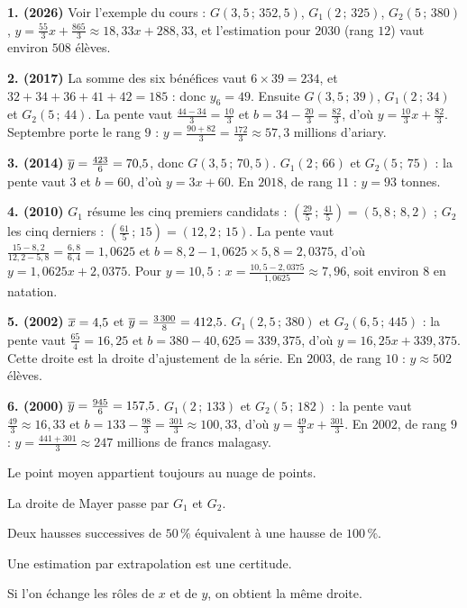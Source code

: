 \begin{corrige}[annales]
\textbf{1. (2026)} Voir l'exemple du cours : $G(3{,}5\,;\,352{,}5)$,
$G_{1}(2\,;\,325)$, $G_{2}(5\,;\,380)$,
$y = \frac{55}{3}x+\frac{865}{3} \approx 18{,}33x+288{,}33$, et
l'estimation pour $2030$ (rang $12$) vaut environ $508$ élèves.

\textbf{2. (2017)} La somme des six bénéfices vaut $6\times39 = 234$, et
$32+34+36+41+42 = 185$ : donc $y_{6} = 49$. Ensuite
$G(3{,}5\,;\,39)$, $G_{1}\left(2\,;\,34\right)$ et
$G_{2}\left(5\,;\,44\right)$. La pente vaut $\frac{44-34}{3} = \frac{10}{3}$
et $b = 34-\frac{20}{3} = \frac{82}{3}$, d'où
$y = \frac{10}{3}x+\frac{82}{3}$. Septembre porte le rang $9$ :
$y = \frac{90+82}{3} = \frac{172}{3} \approx 57{,}3$ millions d'ariary.

\textbf{3. (2014)} $\overline{y} = \frac{423}{6} = 70{,}5$, donc
$G(3{,}5\,;\,70{,}5)$. $G_{1}(2\,;\,66)$ et $G_{2}(5\,;\,75)$ : la pente
vaut $3$ et $b = 60$, d'où $y = 3x+60$. En $2018$, de rang $11$ :
$y = 93$ tonnes.

\textbf{4. (2010)} $G_{1}$ résume les cinq premiers candidats :
$\left(\frac{29}{5}\,;\,\frac{41}{5}\right) = (5{,}8\,;\,8{,}2)$ ; $G_{2}$
les cinq derniers : $\left(\frac{61}{5}\,;\,15\right) = (12{,}2\,;\,15)$.
La pente vaut $\frac{15-8{,}2}{12{,}2-5{,}8} = \frac{6{,}8}{6{,}4}
= 1{,}0625$ et $b = 8{,}2-1{,}0625\times5{,}8 = 2{,}0375$, d'où
$y = 1{,}0625x+2{,}0375$. Pour $y = 10{,}5$ :
$x = \frac{10{,}5-2{,}0375}{1{,}0625} \approx 7{,}96$, soit environ $8$ en
natation.

\textbf{5. (2002)} $\overline{x} = 4{,}5$ et
$\overline{y} = \frac{3\,300}{8} = 412{,}5$. $G_{1}(2{,}5\,;\,380)$ et
$G_{2}(6{,}5\,;\,445)$ : la pente vaut $\frac{65}{4} = 16{,}25$ et
$b = 380-40{,}625 = 339{,}375$, d'où $y = 16{,}25x+339{,}375$. Cette droite
est la droite d'ajustement de la série. En $2003$, de rang $10$ :
$y \approx 502$ élèves.

\textbf{6. (2000)} $\overline{y} = \frac{945}{6} = 157{,}5$.
$G_{1}(2\,;\,133)$ et $G_{2}(5\,;\,182)$ : la pente vaut
$\frac{49}{3} \approx 16{,}33$ et
$b = 133-\frac{98}{3} = \frac{301}{3} \approx 100{,}33$, d'où
$y = \frac{49}{3}x+\frac{301}{3}$. En $2002$, de rang $9$ :
$y = \frac{441+301}{3} \approx 247$ millions de francs malagasy.
\end{corrige}

\begin{vraifaux}
\exo Le point moyen appartient toujours au nuage de points.

\exo La droite de Mayer passe par $G_{1}$ et $G_{2}$.

\exo Deux hausses successives de $50\,\%$ équivalent à une hausse de
$100\,\%$.

\exo Une estimation par extrapolation est une certitude.

\exo Si l'on échange les rôles de $x$ et de $y$, on obtient la même droite.
\end{vraifaux}


